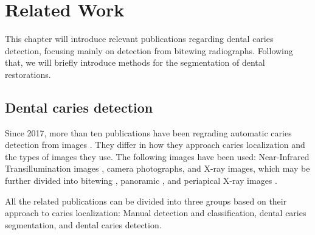 \chapter{Related Work}
This chapter will introduce relevant publications regarding dental caries detection, focusing mainly on detection from bitewing radiographs. Following that, we will briefly introduce methods for the segmentation of dental restorations.

\section{Dental caries detection}
Since 2017, more than ten publications have been regrading automatic caries detection from images \cite{PradosPrivado2020}. They differ in how they approach caries localization and the types of images they use. The following images have been used: Near-Infrared Transillumination images \cite{Casalegno2019,Schwendicke2020}, camera photographs, \cite{Moutselos2019} and X-ray images, which may be further divided into bitewing \cite{Moran2021, Cantu2020, Bayrakdar2021, Mao2021, Srivastava2017}, panoramic \cite{Lian2021}, and periapical X-ray images \cite{Lee2018}.

All the related publications can be divided into three groups based on their approach to caries localization: Manual detection and classification, dental caries segmentation, and dental caries detection.


